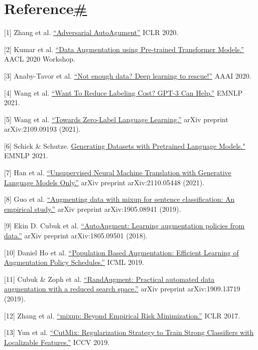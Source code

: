 \section{\texorpdfstring{Reference\hyperref[reference]{\#}}{Reference\#}}\label{reference}

{[}1{]} Zhang et al. \href{https://arxiv.org/abs/1912.11188}{``Adversarial AutoAgument''} ICLR 2020.

{[}2{]} Kumar et al. \href{https://arxiv.org/abs/2003.02245}{``Data Augmentation using Pre-trained Transformer Models.''} AACL 2020 Workshop.

{[}3{]} Anaby-Tavor et al. \href{https://arxiv.org/abs/1911.03118}{``Not enough data? Deep learning to rescue!''} AAAI 2020.

{[}4{]} Wang et al. \href{https://arxiv.org/abs/2108.13487}{``Want To Reduce Labeling Cost? GPT-3 Can Help.''} EMNLP 2021.

{[}5{]} Wang et al. \href{https://arxiv.org/abs/2109.09193}{``Towards Zero-Label Language Learning.''} arXiv preprint arXiv:2109.09193 (2021).

{[}6{]} Schick \& Schutze. \href{https://arxiv.org/abs/2104.07540}{Generating Datasets with Pretrained Language Models."} EMNLP 2021.

{[}7{]} Han et al. \href{https://arxiv.org/abs/2110.05448}{``Unsupervised Neural Machine Translation with Generative Language Models Only.''} arXiv preprint arXiv:2110.05448 (2021).

{[}8{]} Guo et al. \href{https://arxiv.org/abs/1905.08941}{``Augmenting data with mixup for sentence classification: An empirical study.''} arXiv preprint arXiv:1905.08941 (2019).

{[}9{]} Ekin D. Cubuk et al. \href{https://arxiv.org/abs/1805.09501}{``AutoAugment: Learning augmentation policies from data.''} arXiv preprint arXiv:1805.09501 (2018).

{[}10{]} Daniel Ho et al. \href{https://arxiv.org/abs/1905.05393}{``Population Based Augmentation: Efficient Learning of Augmentation Policy Schedules.''} ICML 2019.

{[}11{]} Cubuk \& Zoph et al. \href{https://arxiv.org/abs/1909.13719}{``RandAugment: Practical automated data augmentation with a reduced search space.''} arXiv preprint arXiv:1909.13719 (2019).

{[}12{]} Zhang et al. \href{https://arxiv.org/abs/1710.09412}{``mixup: Beyond Empirical Risk Minimization.''} ICLR 2017.

{[}13{]} Yun et al. \href{https://arxiv.org/abs/1905.04899}{``CutMix: Regularization Strategy to Train Strong Classifiers with Localizable Features.''} ICCV 2019.

